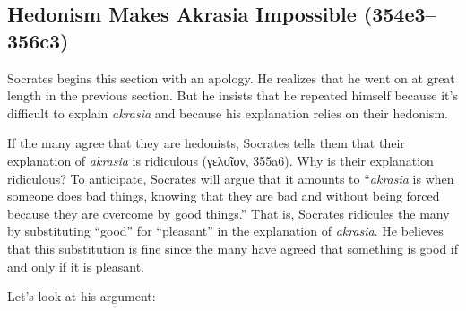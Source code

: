 \documentclass[12pt,letterpaper]{article}
\begin{document}
\subsection*{Hedonism Makes Akrasia Impossible (354e3--356c3)}

Socrates begins this section with an apology.
He realizes that he went on at great length in the previous section.
But he insists that he repeated himself because it's difficult to explain \textit{akrasia} and because his explanation relies on their hedonism.

If the many agree that they are hedonists, Socrates tells them that their explanation of \textit{akrasia} is ridiculous (\textgreek{γελοῖον}, 355a6).
Why is their explanation ridiculous?
To anticipate, Socrates will argue that it amounts to ``\textit{akrasia} is when someone does bad things, knowing that they are bad and without being forced because they are overcome by good things.''
That is, Socrates ridicules the many by substituting ``good'' for ``pleasant'' in the explanation of \textit{akrasia}.
He believes that this substitution is fine since the many have agreed that something is good if and only if it is pleasant.

Let's look at his argument:
\end{document}
